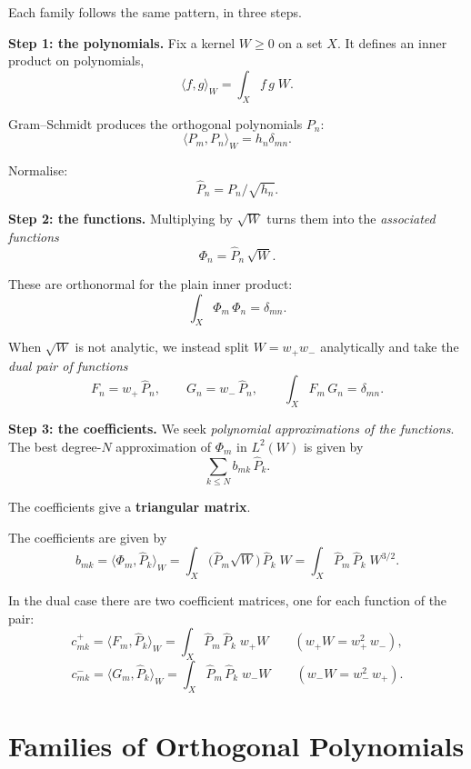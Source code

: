 \documentclass[11pt,a4paper]{article}
\theoremstyle{definition}
\begin{document}
\begin{tcolorbox}[breakable, colback=black!5, colframe=black!5,
  boxrule=0pt, sharp corners]
Each family follows the same pattern, in three steps.

\textbf{Step 1: the polynomials.} Fix a kernel $W \ge 0$ on a set $X$.
It defines an inner product on polynomials,
\[
  \langle f, g \rangle_W = \int_X f\,g\;W.
\]

Gram--Schmidt produces the orthogonal polynomials $P_n$:
\[
  \langle P_m, P_n \rangle_W = h_n \delta_{mn}.
\]

Normalise:
\[
  \widehat P_n = P_n/\sqrt{h_n}.
\]

\medskip
\textbf{Step 2: the functions.} Multiplying by $\sqrt W$ turns them
into the \emph{associated functions}
\[
  \Phi_n = \widehat P_n\, \sqrt W .
\]

These are orthonormal for the plain inner product:
\[
  \int_X \Phi_m\, \Phi_n = \delta_{mn}.
\]

When $\sqrt W$ is not analytic, we instead split $W = w_+ w_-$
analytically and take the \emph{dual pair of functions}
\[
  F_n = w_+\, \widehat P_n, \qquad G_n = w_-\, \widehat P_n,
  \qquad \int_X F_m\, G_n = \delta_{mn}.
\]

\textbf{Step 3: the coefficients.} We seek \emph{polynomial
approximations of the functions}. The best degree-$N$ approximation
of $\Phi_m$ in $L^2(W)$ is given by
\[
  \sum_{k \le N} b_{mk}\, \widehat P_k .
\]

The coefficients give a \textbf{triangular matrix}.

\medskip
The coefficients are given by
\[
  b_{mk} = \langle \Phi_m, \widehat P_k \rangle_W
         = \int_X \bigl(\widehat P_m \sqrt W\bigr)\, \widehat P_k\; W
         = \int_X \widehat P_m\, \widehat P_k\; W^{3/2}.
\]

In the dual case there are two coefficient matrices, one for each
function of the pair:
\[
  c^+_{mk} = \langle F_m, \widehat P_k \rangle_W
         = \int_X \widehat P_m\, \widehat P_k\; w_+ W
  \qquad (w_+ W = w_+^2\, w_-),
\]
\[
  c^-_{mk} = \langle G_m, \widehat P_k \rangle_W
         = \int_X \widehat P_m\, \widehat P_k\; w_- W
  \qquad (w_- W = w_-^2\, w_+).
\]
\end{tcolorbox}

\section{Families of Orthogonal Polynomials}
\end{document}
